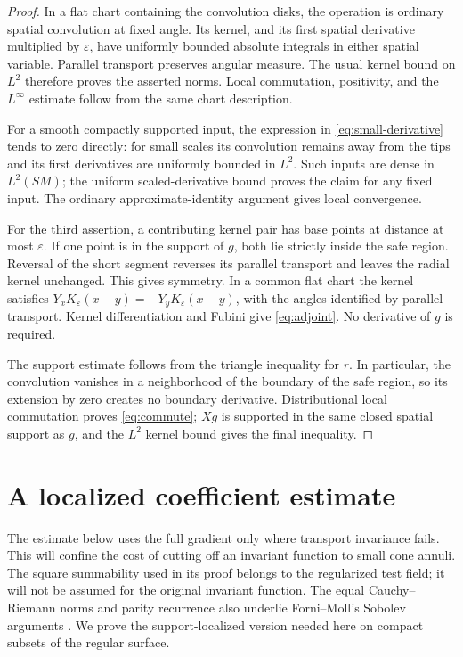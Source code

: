\documentclass[11pt]{article}
\theoremstyle{remark}
\newcommand{\eps}{\varepsilon}
\begin{document}
\begin{proof}
In a flat chart containing the convolution disks, the operation is
ordinary spatial convolution at fixed angle. Its kernel, and its first
spatial derivative multiplied by \(\eps\), have uniformly bounded
absolute integrals in either spatial variable. Parallel transport
preserves angular measure. The usual kernel bound on \(L^2\) therefore
proves the asserted norms. Local commutation, positivity, and the
\(L^\infty\) estimate follow from the same chart description.

For a smooth compactly supported input, the expression in
\eqref{eq:small-derivative} tends to zero directly: for small scales its
convolution remains away from the tips and its first derivatives are
uniformly bounded in \(L^2\). Such inputs are
dense in \(L^2(SM)\); the uniform scaled-derivative bound proves the
claim for any fixed input. The ordinary approximate-identity argument
gives local convergence.

For the third assertion, a contributing kernel pair has base points
at distance at most \(\eps\). If one point is in the support of \(g\),
both lie strictly inside the safe region. Reversal of the short segment
reverses its parallel transport and leaves the radial kernel unchanged.
This gives symmetry. In a common flat chart the kernel satisfies
\(Y_x K_\eps(x-y)=-Y_y K_\eps(x-y)\), with the angles identified
by parallel transport. Kernel differentiation and Fubini give
\eqref{eq:adjoint}. No derivative of \(g\) is required.

The support estimate follows from the triangle inequality for \(r\).
In particular, the convolution vanishes in a neighborhood of the
boundary of the safe region, so its extension by zero creates no
boundary derivative. Distributional local commutation proves
\eqref{eq:commute}; \(Xg\) is supported in the same closed spatial
support as \(g\), and the \(L^2\) kernel bound gives the final inequality.
\end{proof}

\section{A localized coefficient estimate}\label{sec:energy}

The estimate below uses the full gradient only where transport invariance
fails. This will confine the cost of cutting off an invariant function
to small cone annuli.
The square summability used in its proof belongs to the regularized
test field; it will not be assumed for the original invariant function.
The equal Cauchy--Riemann norms and parity recurrence also underlie
Forni--Moll's Sobolev arguments \cite[Lemma~3.3, Corollary~4.2,
and Lemma~5.1]{FM}. We prove the support-localized version needed here
on compact subsets of the regular surface.
\end{document}
